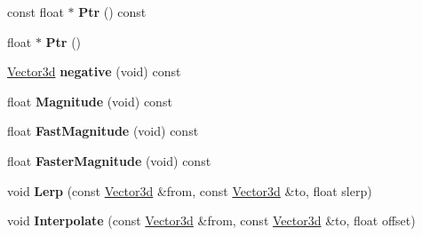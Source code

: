 \begin{DoxyCompactItemize}
\item 
\hypertarget{class_convex_decomposition_1_1_vector3d_af23afcc712fc78ae913a0ed1fcb086cd}{const float $\ast$ {\bfseries Ptr} () const }\label{class_convex_decomposition_1_1_vector3d_af23afcc712fc78ae913a0ed1fcb086cd}

\item 
\hypertarget{class_convex_decomposition_1_1_vector3d_a6818a8193424cfcccbb44cd7a641be45}{float $\ast$ {\bfseries Ptr} ()}\label{class_convex_decomposition_1_1_vector3d_a6818a8193424cfcccbb44cd7a641be45}

\item 
\hypertarget{class_convex_decomposition_1_1_vector3d_ac5714b7d3bda6d146accfb4f5fa61975}{\hyperlink{class_convex_decomposition_1_1_vector3d}{Vector3d} {\bfseries negative} (void) const }\label{class_convex_decomposition_1_1_vector3d_ac5714b7d3bda6d146accfb4f5fa61975}

\item 
\hypertarget{class_convex_decomposition_1_1_vector3d_a7fbf273f825fa20180a3da5da56d521d}{float {\bfseries Magnitude} (void) const }\label{class_convex_decomposition_1_1_vector3d_a7fbf273f825fa20180a3da5da56d521d}

\item 
\hypertarget{class_convex_decomposition_1_1_vector3d_a278628a823491c9e0b59ed13876f5bd0}{float {\bfseries Fast\+Magnitude} (void) const }\label{class_convex_decomposition_1_1_vector3d_a278628a823491c9e0b59ed13876f5bd0}

\item 
\hypertarget{class_convex_decomposition_1_1_vector3d_ad25066344888e26c70a41e17ff7bd050}{float {\bfseries Faster\+Magnitude} (void) const }\label{class_convex_decomposition_1_1_vector3d_ad25066344888e26c70a41e17ff7bd050}

\item 
\hypertarget{class_convex_decomposition_1_1_vector3d_a46b97acefa47333f55deb87cd1c26f3e}{void {\bfseries Lerp} (const \hyperlink{class_convex_decomposition_1_1_vector3d}{Vector3d} \&from, const \hyperlink{class_convex_decomposition_1_1_vector3d}{Vector3d} \&to, float slerp)}\label{class_convex_decomposition_1_1_vector3d_a46b97acefa47333f55deb87cd1c26f3e}

\item 
\hypertarget{class_convex_decomposition_1_1_vector3d_acf3beb94ae3afade74482908abb10d5a}{void {\bfseries Interpolate} (const \hyperlink{class_convex_decomposition_1_1_vector3d}{Vector3d} \&from, const \hyperlink{class_convex_decomposition_1_1_vector3d}{Vector3d} \&to, float offset)}\label{class_convex_decomposition_1_1_vector3d_acf3beb94ae3afade74482908abb10d5a}


\end{DoxyCompactItemize}
